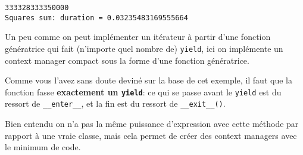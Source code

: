     \begin{Verbatim}[commandchars=\\\{\},frame=single,framerule=0.3mm,rulecolor=\color{cellframecolor}]
333328333350000
Squares sum: duration = 0.03235483169555664
\end{Verbatim}

    Un peu comme on peut implémenter un itérateur à partir d'une fonction
génératrice qui fait (n'importe quel nombre de) \texttt{yield}, ici on
implémente un context manager compact sous la forme d'une fonction
génératrice.

Comme vous l'avez sans doute deviné sur la base de cet exemple, il faut
que la fonction fasse \textbf{exactement un \texttt{yield}}: ce qui se
passe avant le \texttt{yield} est du ressort de \texttt{\_\_enter\_\_},
et la fin est du ressort de \texttt{\_\_exit\_\_()}.

Bien entendu on n'a pas la même puissance d'expression avec cette
méthode par rapport à une vraie classe, mais cela permet de créer des
context managers avec le minimum de code.


    
    
    
